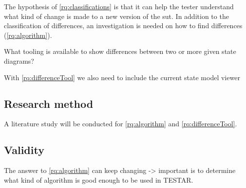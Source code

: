         The hypothesis of \ref{rq:classifications} is that it can help the tester understand what kind of change is made to a new version of the \acrshort{sut}. In addition to the classification of differences, an investigation is needed on how to find differences (\ref{rq:algorithm}).
        
        
        \begin{questions}[resume]
            \item What tooling is available to show differences between two or more given state diagrams? \label{rq:differenceTool}
        \end{questions}
        
        With \ref{rq:differenceTool} we also need to include the current state model viewer \cite{thesisMulders}
        
        
        
        
    

    \subsection{Research method}
    
        A literature study will be conducted for \ref{rq:algorithm} and \ref{rq:differenceTool}. 
        
        
    \subsection{Validity}
    
        The answer to \ref{rq:algorithm} can keep changing -> important is to determine what kind of algorithm is good enough to be used in TESTAR.
        
